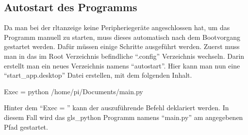 \subsection{Autostart des Programms} \label{autostart}
Da man bei der \acs{rltanzeige} keine Peripheriegeräte angeschlossen hat, um das Programm manuell zu starten, muss dieses automatisch nach dem Bootvorgang gestartet werden. Dafür müssen einige Schritte ausgeführt werden. \newline Zuerst muss man in das im Root Verzeichnis befindliche \enquote{.config} Verzeichnis wechseln. Darin erstellt man ein neues Verzeichnis namens \enquote{autostart}. Hier kann man nun eine \enquote{start\_app.desktop} Datei erstellen, mit dem folgenden Inhalt.
\begin{textcode}
Exec = python /home/pi/Documents/main.py
\end{textcode}
Hinter dem \enquote{Exec = } kann der auszuführende Befehl deklariert werden. In diesem Fall wird das \gls{gls_python} Programm namens \enquote{main.py} am angegebenen Pfad gestartet. \cite[vgl.][]{Grace_Xing:2021}